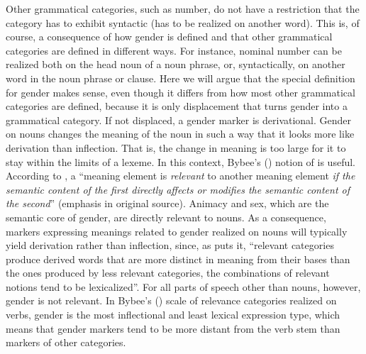 \documentclass[output=collectionpaper]{langsci/langscibook}
\begin{document}
Other grammatical categories, such as number, do not have a restriction that the category has to exhibit syntactic  (has to be realized on another word). This is, of course, a consequence of how gender is defined and that other grammatical categories are defined in different ways. For instance, nominal number can be realized both on the head noun of a noun phrase, or, syntactically, on another word in the noun phrase or clause. Here we will argue that the special definition for gender makes sense, even though it differs from how most other grammatical categories are defined, because it is only displacement that turns gender into a grammatical category. If not displaced, a gender marker is derivational. Gender on nouns changes the meaning of the noun in such a way that it looks more like derivation than inflection. That is, the change in meaning is too large for it to stay within the limits of a lexeme. In this context, Bybee's (\citeyear{Bybee1985a}) notion of  is useful. According to \cite[13]{Bybee1985a}, a ``meaning element is \emph{relevant} to another meaning element \emph{if the semantic content of the first directly affects or modifies the semantic content of the second}'' (emphasis in original source). Animacy and sex, which are the semantic core of gender, are directly relevant to nouns. As a consequence, markers expressing meanings related to gender realized on nouns will typically yield derivation rather than inflection, since, as \cite[17]{Bybee1985a} puts it, ``relevant categories produce derived words that are more distinct in meaning from their bases than the ones produced by less relevant categories, the combinations of relevant notions tend to be lexicalized''. For all parts of speech other than nouns, however, gender is not relevant. In Bybee's (\citeyear{Bybee1985a}) scale of relevance categories realized on verbs, gender is the most inflectional and least lexical expression type, which means that gender markers tend to be more distant from the verb stem than markers of other categories.
\end{document}
